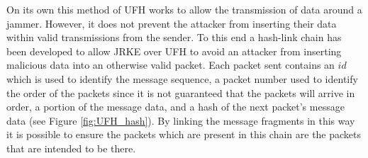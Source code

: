 \documentclass[sigconf]{acmart}
\begin{document}
On its own this method of UFH works to allow the transmission of data around a jammer. However, it does not prevent the attacker from inserting their data within valid transmissions from the sender. To this end a hash-link chain has been developed to allow JRKE over UFH to avoid an attacker from inserting malicious data into an otherwise valid packet. Each packet sent contains an $id$ which is used to identify the message sequence, a packet number used to identify the order of the packets since it is not guaranteed that the packets will arrive in order, a portion of the message data, and a hash of the next packet's message data (see Figure \ref{fig:UFH_hash}). By linking the message fragments in this way it is possible to ensure the packets which are present in this chain are the packets that are intended to be there.
\end{document}
